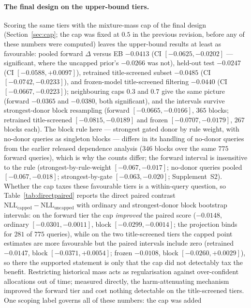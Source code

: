 \documentclass[11pt]{article}
\begin{document}
\paragraph{The final design on the upper-bound tiers.} Scoring the same
tiers with the mixture-mass cap of the final design
(Section~\ref{sec:cap}; the cap was fixed at $0.5$ in the previous revision,
before any of these numbers were computed) leaves the upper-bound
results at least as favourable: pooled forward $\Delta$ versus EB
$-0.0413$ (CI $[-0.0625,-0.0202]$ --- significant, where the uncapped prior's
$-0.0266$ was not), held-out test $-0.0247$ (CI $[-0.0588,+0.0097]$),
retrained title-screened subset $-0.0485$ (CI $[-0.0742,-0.0233]$), and
frozen-model title-screened filtering $-0.0440$ (CI $[-0.0667,-0.0223]$);
neighbouring caps $0.3$ and $0.7$ give the same picture (forward $-0.0365$
and $-0.0380$, both significant), and the intervals survive strongest-donor
block resampling (forward $[-0.0665,-0.0166]$, $365$ blocks;
retrained title-screened $[-0.0815,-0.0189]$ and frozen $[-0.0707,-0.0179]$,
$267$ blocks each). The block rule here --- strongest gated donor by rule
weight, with no-donor queries as singleton blocks --- differs in its
handling of no-donor queries from the earlier released dependence
analysis ($346$ blocks over the same $775$ forward queries), which is why
the counts differ; the forward interval is insensitive to the rule
(strongest-by-rule-weight $[-0.067,-0.017]$; no-donor queries pooled
$[-0.067,-0.018]$; strongest-by-gate $[-0.063,-0.020]$; Supplement~S2).
Whether the cap taxes these favourable tiers is a within-query question,
so Table~\ref{tab:directpaired} reports the direct paired contrast
$\mathrm{NLL}_{\mathrm{capped}} - \mathrm{NLL}_{\mathrm{uncapped}}$ with
ordinary and strongest-donor block bootstrap intervals: on the forward
tier the cap \emph{improved} the paired score ($-0.0148$, ordinary
$[-0.0301,-0.0011]$, block $[-0.0299,-0.0014]$; the projection binds for
$281$ of $775$ queries), while on the two title-screened tiers the capped
point estimates are more favourable but the paired intervals include zero
(retrained $-0.0147$, block $[-0.0371,+0.0054]$; frozen $-0.0108$, block
$[-0.0260,+0.0029]$), so there the supported statement is only that the
cap did not detectably tax the benefit. Restricting historical mass acts
as regularisation against over-confident allocations out of time;
measured directly, the harm-attenuating mechanism improved the forward
tier and cost nothing detectable on the title-screened tiers. One
scoping label governs all of these numbers: the cap was added
\end{document}
